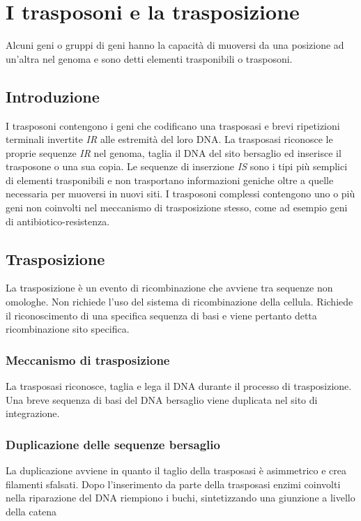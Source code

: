 \section{I trasposoni e la trasposizione}
	
Alcuni geni o gruppi di geni hanno la capacità di muoversi da una posizione ad un'altra nel genoma e sono detti elementi trasponibili o trasposoni. 

	\subsection{Introduzione}
	I trasposoni contengono i geni che codificano una trasposasi e brevi ripetizioni terminali invertite \emph{IR} alle estremità del loro DNA. 
	La trasposasi riconosce le proprie sequenze \emph{IR} nel genoma, taglia il DNA del sito bersaglio ed inserisce il trasposone o una sua copia. 
	Le sequenze di inserzione \emph{IS}  sono i tipi più semplici di elementi trasponibili e non trasportano informazioni geniche oltre a quelle necessaria per muoversi in nuovi siti.
	I trasposoni complessi contengono uno o più geni non coinvolti nel meccanismo di trasposizione stesso, come ad esempio geni di antibiotico-resistenza.

	\subsection{Trasposizione}
	La trasposizione è un evento di ricombinazione che avviene tra sequenze non omologhe.
	Non richiede l'uso del sistema di ricombinazione della cellula. 
	Richiede il riconoscimento di una specifica sequenza di basi e viene pertanto detta ricombinazione sito specifica.
	
		\subsubsection{Meccanismo di trasposizione}
		La trasposasi riconosce, taglia e lega il DNA durante il processo di trasposizione. 
		Una breve sequenza di basi del DNA bersaglio viene duplicata nel sito di integrazione. 

		\subsubsection{Duplicazione delle sequenze bersaglio}
		La duplicazione avviene in quanto il taglio della trasposasi \`e asimmetrico e crea filamenti sfalsati.
		Dopo l'inserimento da parte della trasposasi enzimi coinvolti nella riparazione del DNA riempiono i buchi, sintetizzando una giunzione a livello della catena


